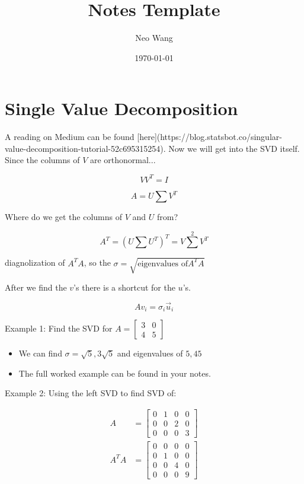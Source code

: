 \documentclass{article}
\title{Notes Template}
\author{Neo Wang}
\date{\today}
\begin{document}
\maketitle
\tableofcontents


\section{Single Value Decomposition}

\begin{markdown}

A reading on Medium can be found [here](https://blog.statsbot.co/singular-value-decomposition-tutorial-52c695315254). Now we will get into the SVD itself. Since the columns of $V$ are orthonormal...

$$VV^T=I$$

$$A = U\sum V^T$$

Where do we get the columns of $V$ and $U$ from?

$$A^T = (U\sum U^T)^T=V\sum^2 V^T$$

diagnolization of $A^TA$, so the $\sigma=\sqrt{\text{eigenvalues of}A^TA}$

\end{markdown}

After we find the $v$'s there is a shortcut for the $u$'s.

$$Av_i=\sigma_i\vec{u}_i$$

Example 1: Find the SVD for $A = \begin{bmatrix}
	3 & 0 \\4&5
\end{bmatrix}$

\begin{itemize}
	\item We can find $\sigma = \sqrt{5}, 3\sqrt{5}$ and eigenvalues of $5, 45$
	\item The full worked example can be found in your notes.
\end{itemize}

Example 2: Using the left SVD to find SVD of:

$$
\begin{aligned}
	A    & =
	\begin{bmatrix}
		0 & 1 & 0 & 0 \\0&0&2&0\\0&0&0&3
	\end{bmatrix} \\
	A^TA & =
	\begin{bmatrix}
		0 & 0 & 0 & 0 \\0&1&0&0\\0&0&4&0\\0&0&0&9
	\end{bmatrix} \\
\end{aligned}
$$
\end{document}
